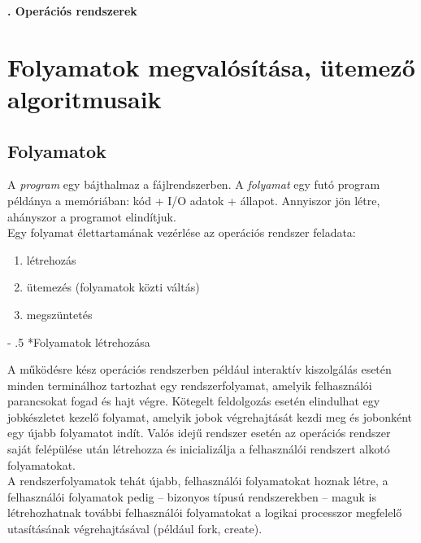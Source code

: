 \documentclass[tikz,12pt,margin=0px]{article}
\makeatletter
\renewcommand\paragraph{%
	\@startsection{paragraph}{4}{0mm}%
	{-\baselineskip}%
	{.5\baselineskip}%
	{\normalfont\normalsize\bfseries}}
\makeatother
\begin{document}
    \thispagestyle{fancy}

    \begin{center}
        {\Large\bfseries{}. Operációs rendszerek} \\
    \end{center}

	\section*{Folyamatok megvalósítása, ütemező algoritmusaik}
	
    \subsection*{Folyamatok}

    A \emph{program} egy bájthalmaz a fájlrendszerben. A \emph{folyamat} egy futó program példánya a memóriában: kód + I/O adatok + állapot. Annyiszor jön létre, ahányszor a programot elindítjuk.\\

    \noindent Egy folyamat élettartamának vezérlése az operációs rendszer feladata:

    \begin{enumerate}[topsep=8pt,itemsep=4pt,partopsep=4pt, parsep=4pt]
        \item létrehozás
        \item ütemezés (folyamatok közti váltás)
        \item megszüntetés
    \end{enumerate}

    \paragraph*{Folyamatok létrehozása}

    A működésre kész operációs rendszerben például interaktív kiszolgálás esetén minden terminálhoz tartozhat egy rendszerfolyamat, amelyik felhasználói parancsokat fogad és hajt végre. Kötegelt feldolgozás esetén elindulhat egy jobkészletet kezelő folyamat, amelyik jobok végrehajtását kezdi meg és jobonként egy újabb folyamatot indít. Valós idejű rendszer esetén az operációs rendszer saját felépülése után létrehozza és inicializálja a felhasználói rendszert alkotó folyamatokat.\\

    \noindent A rendszerfolyamatok tehát újabb, felhasználói folyamatokat hoznak létre, a felhasználói folyamatok pedig – bizonyos típusú rendszerekben – maguk is létrehozhatnak további felhasználói folyamatokat a logikai processzor megfelelő utasításának végrehajtásával (például fork, create).\\
\end{document}
